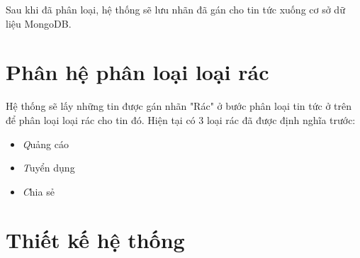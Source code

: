 Sau khi đã phân loại, hệ thống sẽ lưu nhãn đã gán cho tin tức xuống cơ sở dữ liệu MongoDB.

\section{Phân hệ phân loại loại rác}
Hệ thống sẽ lấy những tin được gán nhãn "Rác" ở bước phân loại tin tức ở trên để phân loại loại rác cho tin đó. Hiện tại có 3 loại rác đã được định nghĩa trước:
\begin{itemize}
	\item \textit Quảng cáo
	\item \textit Tuyển dụng
	\item \textit Chia sẻ
\end{itemize}

\section{Thiết kế hệ thống} 

